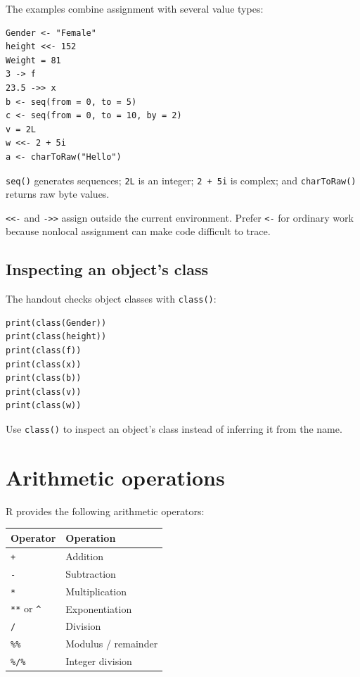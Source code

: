 The examples combine assignment with several value types:

\begin{lstlisting}[style=dsr]
Gender <- "Female"
height <<- 152
Weight = 81
3 -> f
23.5 ->> x
b <- seq(from = 0, to = 5)
c <- seq(from = 0, to = 10, by = 2)
v = 2L
w <<- 2 + 5i
a <- charToRaw("Hello")
\end{lstlisting}

\texttt{seq()} generates sequences; \texttt{2L} is an integer; \texttt{2 + 5i} is complex; and \texttt{charToRaw()} returns raw byte values.

\begin{pitfall}
\texttt{<<-} and \texttt{->>} assign outside the current environment. Prefer \texttt{<-} for ordinary work because nonlocal assignment can make code difficult to trace.
\end{pitfall}

\subsection{Inspecting an object's class}

The handout checks object classes with \texttt{class()}:

\begin{lstlisting}[style=dsr]
print(class(Gender))
print(class(height))
print(class(f))
print(class(x))
print(class(b))
print(class(v))
print(class(w))
\end{lstlisting}

\begin{keyidea}
Use \texttt{class()} to inspect an object's class instead of inferring it from the name.
\end{keyidea}

\section{Arithmetic operations}

R provides the following arithmetic operators:

\begin{dstable}
\begin{tabularx}{\linewidth}{@{}p{2.2cm}X@{}}
\toprule
\rowcolor{DSPaleBlue!92}
Operator & Operation \\
\midrule
\texttt{+} & Addition \\
\texttt{-} & Subtraction \\
\texttt{*} & Multiplication \\
\texttt{**} or \texttt{\^} & Exponentiation \\
\texttt{/} & Division \\
\texttt{\%\%} & Modulus / remainder \\
\texttt{\%/\%} & Integer division \\
\bottomrule
\end{tabularx}
\end{dstable}

